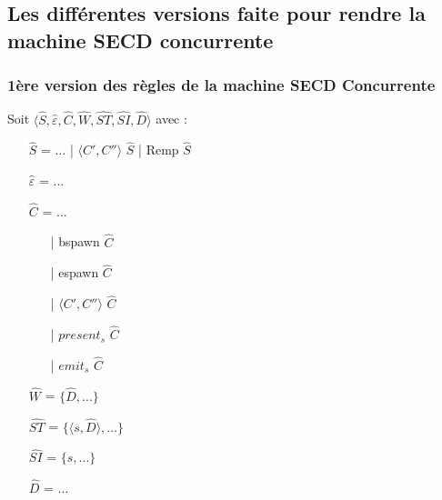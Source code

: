 \documentclass[10pt,a4paper]{article}
\begin{document}
			\subsection{Les différentes versions faite pour rendre la machine SECD concurrente}
				\subsubsection{1ère version des règles de la machine SECD Concurrente}\label{SECDConc1}
					Soit $\langle\widehat{S},\widehat{\varepsilon},\widehat{C},\widehat{W},\widehat{ST},\widehat{SI},\widehat{D}\rangle$ avec :
					
					\begin{itemize}
						\item[] $\widehat{S}$ = ... | $\langle C',C''\rangle$ $\widehat{S}$ | Remp $\widehat{S}$
						\item[] $\widehat{\varepsilon}$ = ... 
						\item[] $\widehat{C}$ = ... 
						\begin{itemize}
							\item[|] bspawn $\widehat{C}$ 
							\item[|] espawn $\widehat{C}$
							\item[|] $\langle C',C''\rangle$ $\widehat{C}$
							\item[|] $present_{s}$ $\widehat{C}$
							\item[|] $emit_{s}$ $\widehat{C}$ 
						\end{itemize}
						\item[] $\widehat{W}$ = $\{\widehat{D},...\}$
						\item[] $\widehat{ST}$ = $\{\langle s,\widehat{D}\rangle,...\}$
						\item[] $\widehat{SI}$ = $\{ s,...\}$
						\item[] $\widehat{D}$ = ...
					\end{itemize}
					\bigbreak
					
\end{document}
